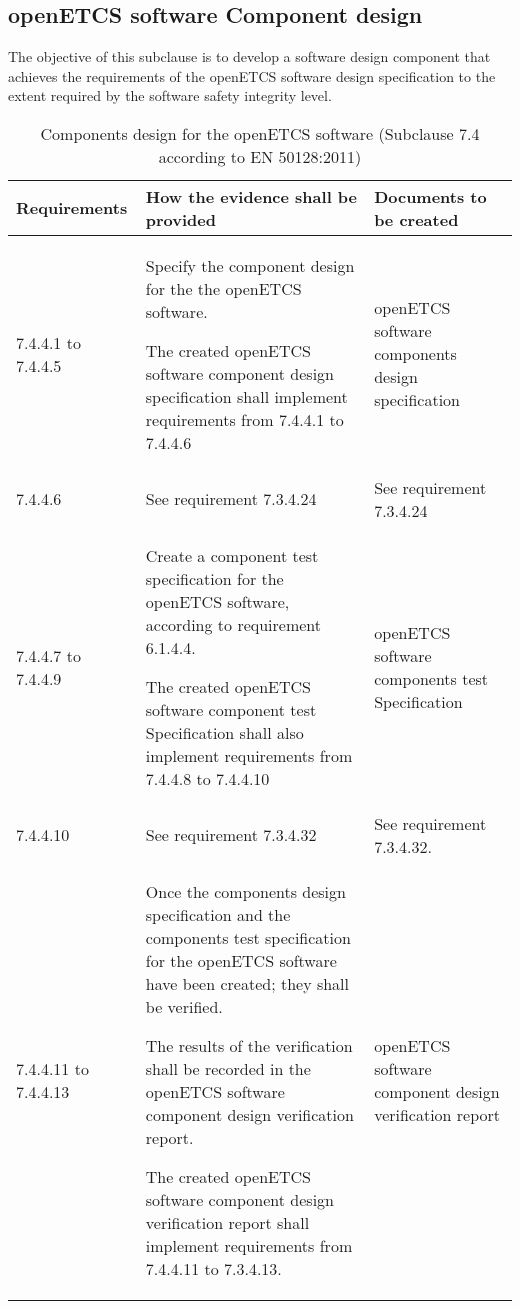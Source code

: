 \documentclass{template/openetcs_report}
\begin{document}
\subsection{openETCS software Component design}
\begin{flushleft}
The objective of this subclause is to develop a software design component that achieves the requirements of the openETCS software design specification to the extent required by the software safety integrity level.
\end{flushleft}
{\footnotesize\sffamily\centering
\begin{longtable}{|p{2cm}|p{9cm}|p{3cm}|}
\caption{Components design for the openETCS software (Subclause 7.4 according to EN 50128:2011)}\\
\hline
\bfseries Requirements & \bfseries How the evidence shall be provided & \bfseries Documents to be created\\
\hline
\hline
\endhead
\hline
\endfoot

7.4.4.1 to 7.4.4.5 & Specify the component design for the the openETCS software.
 
The created openETCS software component design specification shall implement requirements from 7.4.4.1 to 7.4.4.6
& openETCS software components design specification\\ 
\hline
7.4.4.6 & See requirement 7.3.4.24 & See requirement 7.3.4.24\\ 
\hline
7.4.4.7 to 7.4.4.9 & Create a component test specification for the openETCS software, according to requirement 6.1.4.4.

The created openETCS software component test Specification shall also implement requirements from 7.4.4.8 to 7.4.4.10
& openETCS software components test Specification\\ 
\hline
7.4.4.10 & See requirement 7.3.4.32 & See requirement 7.3.4.32.\\ 
\hline
7.4.4.11 to 7.4.4.13 & Once the components design specification and the components test specification for the openETCS software have been created; they shall be verified.

The results of the verification shall be recorded in the openETCS software component design verification report.

The created openETCS software component design verification report shall implement requirements from 7.4.4.11 to 7.3.4.13.
& openETCS software component design verification report  \\ 
\hline
\end{longtable}}
\end{document}
